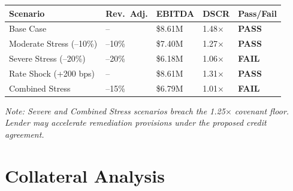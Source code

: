 \documentclass[11pt,a4paper]{article}
\begin{document}
\vspace{2pt}
\renewcommand{\arraystretch}{1.35}
\begin{tabularx}{\textwidth}{@{} L{3.8cm} R{2.0cm} R{2.0cm} R{2.0cm} C{3.5cm} @{}}
  \toprule
  {\color{white}\bfseries Scenario} &
  {\color{white}\bfseries Rev.\ Adj.} &
  {\color{white}\bfseries EBITDA} &
  {\color{white}\bfseries DSCR} &
  {\color{white}\bfseries Pass/Fail} \\
  \midrule
  Base Case                  & --          & \$8.61M  & 1.48$\times$ & {\color{GreenOK}\bfseries PASS} \\
  Moderate Stress (--10\%)   & --10\%      & \$7.40M  & 1.27$\times$ & {\color{GreenOK}\bfseries PASS} \\
  Severe Stress (--20\%)     & --20\%      & \$6.18M  & 1.06$\times$ & {\color{AlertRed}\bfseries FAIL} \\
  Rate Shock (+200 bps)      & --          & \$8.61M  & 1.31$\times$ & {\color{GreenOK}\bfseries PASS} \\
  Combined Stress            & --15\%      & \$6.79M  & 1.01$\times$ & {\color{AlertRed}\bfseries FAIL} \\
  \bottomrule
\end{tabularx}

\vspace{2pt}
{\small\color{SlateGray}\textit{Note: Severe and Combined Stress scenarios breach the 1.25$\times$ covenant floor.
Lender may accelerate remediation provisions under the proposed credit agreement.}}

\vspace{6mm}

\section{Collateral Analysis}
\end{document}
